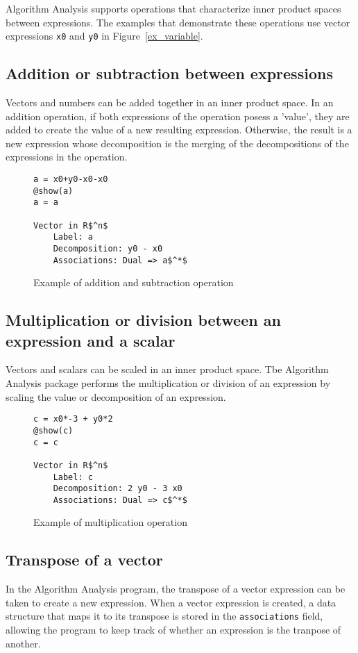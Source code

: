 Algorithm Analysis supports operations that characterize inner product spaces between expressions. The examples that demonstrate these operations use vector expressions \texttt{x0} and \texttt{y0} in Figure~\ref{ex_variable}.

\subsection*{Addition or subtraction between expressions}

Vectors and numbers can be added together in an inner product space. In an addition operation, if both expressions of the operation posess a 'value', they are added to create the value of a new resulting expression. Otherwise, the result is a new expression whose decomposition is the merging of the decompositions of the expressions in the operation.
\begin{figure}[!h]
	\begin{lstlisting}[mathescape]
a = x0+y0-x0-x0
@show(a)
a = a

Vector in R$^n$
	Label: a
	Decomposition: y0 - x0
	Associations: Dual => a$^*$
	\end{lstlisting}
	\caption{Example of addition and subtraction operation}
	\label{ex_addsub}
\end{figure}

\subsection*{Multiplication or division between an expression and a scalar} 
Vectors and scalars can be scaled in an inner product space. Tbe Algorithm Analysis package performs the multiplication or division of an expression by scaling the value or decomposition of an expression.
\begin{figure}[!h]
	\begin{lstlisting}[mathescape]
c = x0*-3 + y0*2
@show(c)
c = c

Vector in R$^n$
	Label: c
	Decomposition: 2 y0 - 3 x0
	Associations: Dual => c$^*$

	\end{lstlisting}
	\caption{Example of multiplication operation}
	\label{ex_scalar}
\end{figure}

\subsection*{Transpose of a vector}
In the Algorithm Analysis program, the transpose of a vector expression can be taken to create a new expression. When a vector expression is created, a data structure that maps it to its transpose is stored in the \texttt{associations} field, allowing the program to keep track of whether an expression is the tranpose of another.

